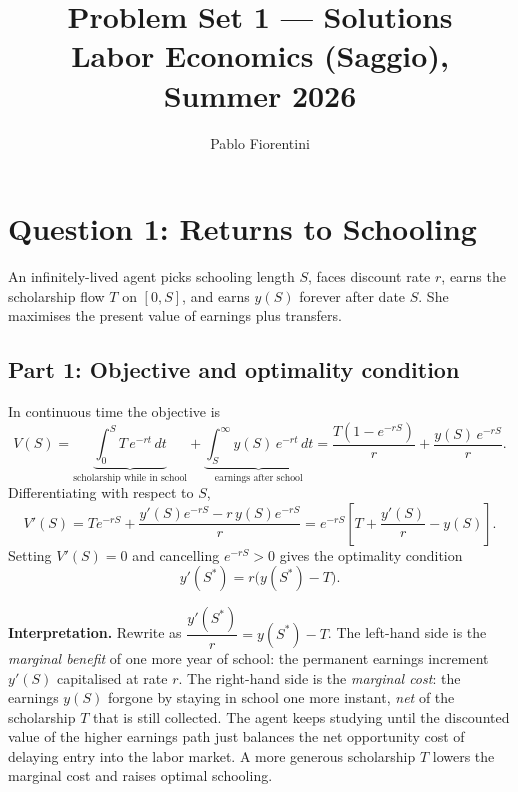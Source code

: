 \documentclass[11pt,english]{article}
\title{Problem Set 1 --- Solutions\\
\large Labor Economics (Saggio), Summer 2026}
\author{Pablo Fiorentini}
\date{}
\begin{document}
\maketitle

\section*{Question 1: Returns to Schooling}

An infinitely-lived agent picks schooling length $S$, faces discount rate $r$,
earns the scholarship flow $T$ on $[0,S]$, and earns $y(S)$ forever after date
$S$. She maximises the present value of earnings plus transfers.

\subsection*{Part 1: Objective and optimality condition}

In continuous time the objective is
\begin{equation}
V(S)=\underbrace{\int_{0}^{S}T\,e^{-rt}\,dt}_{\text{scholarship while in school}}
     +\underbrace{\int_{S}^{\infty}y(S)\,e^{-rt}\,dt}_{\text{earnings after school}}
     =\frac{T\left(1-e^{-rS}\right)}{r}+\frac{y(S)\,e^{-rS}}{r}.
\end{equation}
Differentiating with respect to $S$,
\begin{equation}
V'(S)=T e^{-rS}+\frac{y'(S)e^{-rS}-r\,y(S)e^{-rS}}{r}
     =e^{-rS}\!\left[T+\frac{y'(S)}{r}-y(S)\right].
\end{equation}
Setting $V'(S)=0$ and cancelling $e^{-rS}>0$ gives the optimality condition
\begin{equation}\boxed{\;y'(S^{*})=r\bigl(y(S^{*})-T\bigr).\;}\end{equation}

\textbf{Interpretation.} Rewrite as $\dfrac{y'(S^{*})}{r}=y(S^{*})-T$. The
left-hand side is the \emph{marginal benefit} of one more year of school: the
permanent earnings increment $y'(S)$ capitalised at rate $r$. The right-hand
side is the \emph{marginal cost}: the earnings $y(S)$ forgone by staying in
school one more instant, \emph{net} of the scholarship $T$ that is still
collected. The agent keeps studying until the discounted value of the higher
earnings path just balances the net opportunity cost of delaying entry into the
labor market. A more generous scholarship $T$ lowers the marginal cost and
raises optimal schooling.
\end{document}
